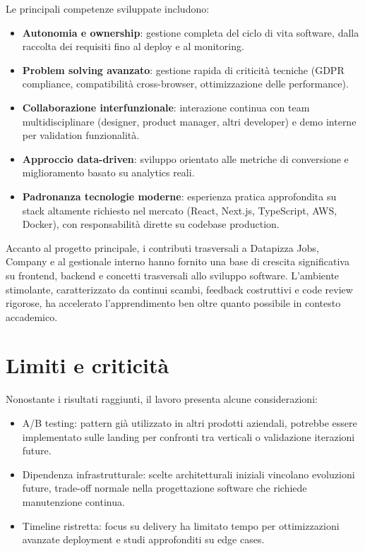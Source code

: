 Le principali competenze sviluppate includono:
\begin{itemize}
  \item \textbf{Autonomia e ownership}: gestione completa del ciclo di vita software, 
        dalla raccolta dei requisiti fino al deploy e al monitoring.
  \item \textbf{Problem solving avanzato}: gestione rapida di criticità tecniche 
        (GDPR compliance, compatibilità cross-browser, ottimizzazione delle performance).
  \item \textbf{Collaborazione interfunzionale}: interazione continua con team 
        multidisciplinare (designer, product manager, altri developer) e demo 
        interne per validation funzionalità.
  \item \textbf{Approccio data-driven}: sviluppo orientato alle metriche di conversione
        e miglioramento basato su analytics reali.
  \item \textbf{Padronanza tecnologie moderne}: esperienza pratica approfondita 
        su stack altamente richiesto nel mercato (React, Next.js, TypeScript, 
        AWS, Docker), con responsabilità dirette su codebase production.
\end{itemize}

Accanto al progetto principale, i contributi trasversali a Datapizza Jobs, Company
e al gestionale interno hanno fornito una base di crescita significativa su frontend, 
backend e concetti trasversali allo sviluppo software. L'ambiente stimolante, 
caratterizzato da continui scambi, feedback costruttivi e code review rigorose, 
ha accelerato l'apprendimento ben oltre quanto possibile in contesto accademico.

\section{Limiti e criticità}
Nonostante i risultati raggiunti, il lavoro presenta alcune considerazioni:
\begin{itemize}
  \item A/B testing: pattern già utilizzato in altri prodotti aziendali, 
        potrebbe essere implementato sulle landing per confronti tra verticali 
        o validazione iterazioni future.
  \item Dipendenza infrastrutturale: scelte architetturali iniziali vincolano 
        evoluzioni future, trade-off normale nella progettazione software che 
        richiede manutenzione continua.
  \item Timeline ristretta: focus su delivery ha limitato tempo per ottimizzazioni 
        avanzate deployment e studi approfonditi su edge cases.
\end{itemize}

